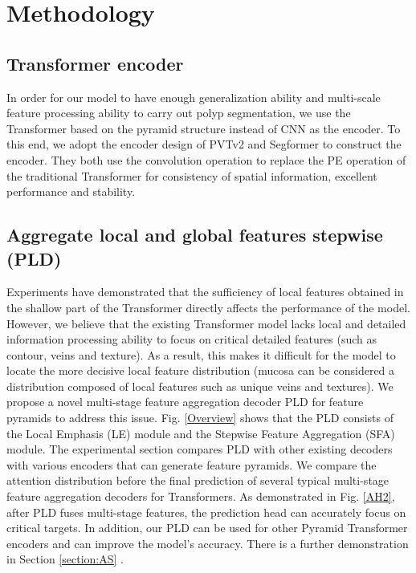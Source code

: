 \documentclass[runningheads]{llncs}
\begin{document}
\section{Methodology}

\subsection{Transformer encoder}
\label{MiT}
In order for our model to have enough generalization ability and multi-scale feature processing ability to carry out polyp segmentation, we use the Transformer based on the pyramid structure instead of CNN as the encoder. To this end, we adopt the encoder design of PVTv2 \cite{pvtv2} and Segformer to construct the encoder. They both use the convolution operation to replace the PE operation of the traditional Transformer for consistency of spatial information, excellent performance and stability.

\subsection{Aggregate local and global features stepwise (PLD)}
\label{PLD_section}
Experiments \cite{raghu2021vision,zheng2021rethinking} have demonstrated that the sufficiency of local features obtained in the shallow part of the Transformer directly affects the performance of the model. However, we believe that the existing Transformer model lacks local and detailed information processing ability to focus on critical detailed features (such as contour, veins and texture). As a result, this makes it difficult for the model to locate the more decisive local feature distribution (mucosa can be considered a distribution composed of local features such as unique veins and textures). We propose a novel multi-stage feature aggregation decoder PLD for feature pyramids to address this issue. Fig. \ref{Overview} shows that the PLD consists of the Local Emphasis (LE) module and the Stepwise Feature Aggregation (SFA) module. The experimental section compares PLD with other existing decoders with various encoders that can generate feature pyramids. We compare the attention distribution before the final prediction of several typical multi-stage feature aggregation decoders for Transformers. As demonstrated in Fig. \ref{AH2}, after PLD fuses multi-stage features, the prediction head can accurately focus on critical targets. In addition, our PLD can be used for other Pyramid Transformer encoders and can improve the model's accuracy. There is a further demonstration in Section \ref{section:AS} .
\end{document}

